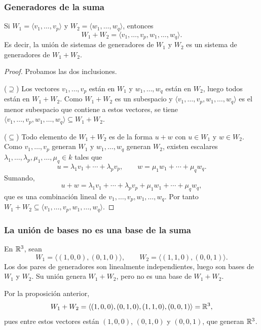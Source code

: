 \begin{frame}[allowframebreaks, t]
    \frametitle{Generadores de la suma}

    \begin{proposition}
        Si $W_1=\langle v_1,\ldots,v_p\rangle$ y
        $W_2=\langle w_1,\ldots,w_q\rangle$, entonces
        \[
            W_1+W_2=\langle v_1,\ldots,v_p,w_1,\ldots,w_q\rangle.
        \]
        Es decir, la unión de sistemas de generadores de $W_1$ y $W_2$
        es un sistema de generadores de $W_1+W_2$.
    \end{proposition}

    \begin{proof}
        Probamos las dos inclusiones.

        ($\supseteq$) Los vectores $v_1,\ldots,v_p$ están en $W_1$ y
        $w_1,\ldots,w_q$ están en $W_2$, luego todos están en $W_1+W_2$.
        Como $W_1+W_2$ es un subespacio y
        $\langle v_1,\ldots,v_p,w_1,\ldots,w_q\rangle$ es el menor
        subespacio que contiene a estos vectores, se tiene
        $\langle v_1,\ldots,v_p,w_1,\ldots,w_q\rangle\subseteq W_1+W_2$.

        ($\subseteq$) Todo elemento de $W_1+W_2$ es de la forma $u+w$ con
        $u\in W_1$ y $w\in W_2$. Como $v_1,\ldots,v_p$ generan $W_1$ y
        $w_1,\ldots,w_q$ generan $W_2$, existen escalares
        $\lambda_1,\ldots,\lambda_p,\mu_1,\ldots,\mu_q\in k$ tales que
        \[
            u=\lambda_1v_1+\cdots+\lambda_pv_p,
            \qquad
            w=\mu_1w_1+\cdots+\mu_qw_q.
        \]
        Sumando,
        \[
            u+w=\lambda_1v_1+\cdots+\lambda_pv_p+\mu_1w_1+\cdots+\mu_qw_q,
        \]
        que es una combinación lineal de
        $v_1,\ldots,v_p,w_1,\ldots,w_q$.
        Por tanto $W_1+W_2\subseteq\langle v_1,\ldots,v_p,w_1,\ldots,w_q\rangle$.
    \end{proof}
\end{frame}


\begin{frame}
    \frametitle{La unión de bases no es una base de la suma}

    \begin{example}
        En $\mathbb{R}^3$, sean
        \[
            W_1=\langle(1,0,0),(0,1,0)\rangle,
            \qquad
            W_2=\langle(1,1,0),(0,0,1)\rangle.
        \]
        Los dos pares de generadores son linealmente independientes, luego
        son bases de $W_1$ y $W_2$. Su unión genera $W_1+W_2$, pero
        \alert{no} es una base de $W_1+W_2$.
    \end{example}

    Por la proposición anterior,
    \[
        W_1+W_2=\langle(1,0,0),(0,1,0),(1,1,0),(0,0,1)\rangle=\mathbb{R}^3,
    \]
    pues entre estos vectores están $(1,0,0)$, $(0,1,0)$ y $(0,0,1)$,
    que generan $\mathbb{R}^3$.
\end{frame}



